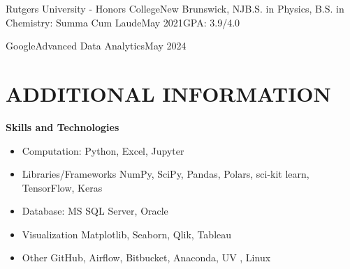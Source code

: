 \documentclass[pdftitle={Michael Tran Resume},pdfauthor={Michael Tran}]{resume}
\begin{document}
\begin{educationentry}{Rutgers University - Honors College}{New Brunswick, NJ}{B.S. in Physics, B.S. in Chemistry: Summa Cum Laude}{May 2021}{{GPA: 3.9/4.0}}
\end{educationentry}

\begin{educationentry}{Google}{}{Advanced Data Analytics}{May 2024}{}
\end{educationentry}

\separator

\section{ADDITIONAL INFORMATION}

\textbf{Skills and Technologies}
\begin{itemize}
    \item Computation: Python, Excel, Jupyter
    \item Libraries/Frameworks NumPy, SciPy, Pandas, Polars, sci-kit learn, TensorFlow, Keras
    \item Database: MS SQL Server, Oracle
    \item Visualization Matplotlib, Seaborn, Qlik, Tableau
    \item Other GitHub, Airflow, Bitbucket, Anaconda, UV , Linux
\end{itemize}
\end{document}
